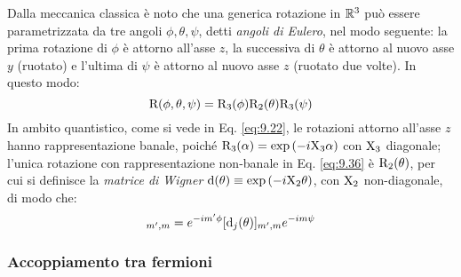 Dalla meccanica classica è noto che una generica rotazione in $ \mathbb{R}^3 $ può essere parametrizzata da tre angoli $ \phi,\theta,\psi $, detti \textit{angoli di Eulero}, nel modo seguente: la prima rotazione di $ \phi $ è attorno all'asse $ z $, la successiva di $ \theta $ è attorno al nuovo asse $ y $ (ruotato) e l'ultima di $ \psi $ è attorno al nuovo asse $ z $ (ruotato due volte). In questo modo:
\begin{equation}
	\mathrm{R}(\phi,\theta,\psi) = \mathrm{R}_3(\phi) \mathrm{R}_2(\theta) \mathrm{R}_3(\psi)
	\label{eq:9.36}
\end{equation}
In ambito quantistico, come si vede in Eq. \ref{eq:9.22}, le rotazioni attorno all'asse $ z $ hanno rappresentazione banale, poiché $ \mathrm{R}_3(\alpha) = \exp \left( -i \mathrm{X}_3 \alpha \right) $ con $ \mathrm{X}_3 $ diagonale; l'unica rotazione con rappresentazione non-banale in Eq. \ref{eq:9.36} è $ \mathrm{R}_2(\theta) $, per cui si definisce la \textit{matrice di Wigner} $ \mathrm{d}(\theta) \equiv \exp \left( -i \mathrm{X}_2 \theta \right) $, con $ \mathrm{X}_2 $ non-diagonale, di modo che:
\begin{equation}
	[\rho_j(\phi,\theta,\psi)]_{m',m} = e^{-i m' \phi} [\tens{d}_j(\theta)]_{m',m} e^{-i m \psi}
	\label{eq:9.37}
\end{equation}

\subsubsection{Accoppiamento tra fermioni}

